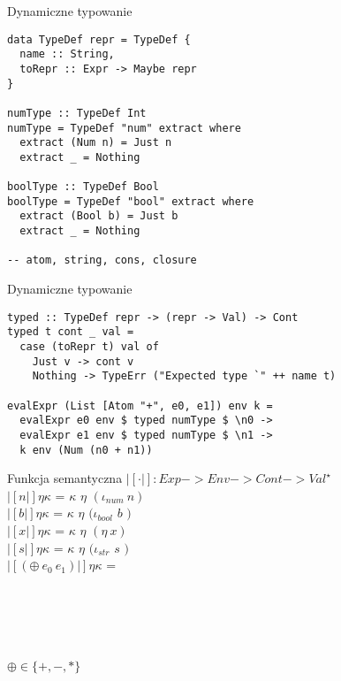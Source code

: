 \documentclass[12pt,serif]{beamer}
\begin{document}
\begin{frame}[fragile]{Dynamiczne typowanie}
\footnotesize \begin{verbatim}
data TypeDef repr = TypeDef {
  name :: String,
  toRepr :: Expr -> Maybe repr
}

numType :: TypeDef Int
numType = TypeDef "num" extract where
  extract (Num n) = Just n
  extract _ = Nothing

boolType :: TypeDef Bool
boolType = TypeDef "bool" extract where
  extract (Bool b) = Just b
  extract _ = Nothing
  
-- atom, string, cons, closure
\end{verbatim}
\end{frame}

\begin{frame}[fragile]{Dynamiczne typowanie}
\footnotesize \begin{verbatim}
typed :: TypeDef repr -> (repr -> Val) -> Cont
typed t cont _ val =
  case (toRepr t) val of
    Just v -> cont v
    Nothing -> TypeErr ("Expected type `" ++ name t)

evalExpr (List [Atom "+", e0, e1]) env k =
  evalExpr e0 env $ typed numType $ \n0 ->
  evalExpr e1 env $ typed numType $ \n1 ->
  k env (Num (n0 + n1))
\end{verbatim}
\end{frame}


\begin{frame}{Funkcja semantyczna}
$|[ \cdot |]: Exp -> Env -> Cont -> Val^{\star}$ \newline
\\
$|[n|] \eta \kappa$ = $\kappa$ $\eta$ $(\iota_{num}~n)$ \\
$|[b|] \eta \kappa$ = $\kappa$ $\eta$ $(\iota_{bool}$ $b$ $)$ \\
$|[x|] \eta \kappa$ = $\kappa$ $\eta$ $(\eta~x)$ \\
$|[s|] \eta \kappa$ = $\kappa$ $\eta$ $(\iota_{str}$ $s$ $)$ \newline
\\
$|[(\oplus~e_0~e_1)|] \eta \kappa$ = \\
\hspace{1em}{$|[e_0|]$ $\eta$ ($\lambda \eta_0 n_0$ .} \\
\hspace{2em}{$|[e_1|]$ $\eta$ ($\lambda \eta_1 n_1$ .} \\
 \\
 \\
 \newline
\\
$\oplus \in \{+,-,*\}$
\end{frame}
\end{document}
